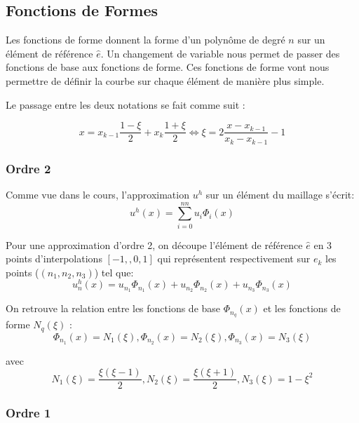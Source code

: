 \documentclass[a4paper,10pt]{report} %
\begin{document}
\subsection{Fonctions de Formes}

Les fonctions de forme donnent la forme d'un polynôme de degré $n$ sur un élément de référence $\hat{e}$. Un changement de variable nous permet de passer des fonctions de base aux fonctions de forme. Ces fonctions de forme vont nous permettre de définir la courbe sur chaque élément de manière plus simple.

Le passage entre les deux notations se fait comme suit :

\begin{displaymath}
		x=x_{k-1}\frac{1-\xi}{2}+x_{k}\frac{1+\xi}{2} \Leftrightarrow \xi=2\frac{x-x_{k-1}}{x_{k}-x_{k-1}}-1
\end{displaymath}

\subsubsection{Ordre 2}

Comme vue dans le cours, l'approximation $u^{h}$ sur un élément du maillage s'écrit:
\begin{displaymath}
u^{h}(x)=\sum_{i=0}^{nn}u_{i}\Phi_{i}(x)\end{displaymath}

Pour une approximation d'ordre 2, on découpe l'élément de référence $\hat{e}$ en 3 points d'interpolations $[-1,,0,1]$ qui représentent respectivement sur $e_{k}$ les points ($(n_{1},n_{2},n_{3})$) tel que:
\begin{displaymath}
u^{h}_n(x)=u_{n_{1}}\Phi_{n_{1}}(x)+u_{n_{2}}\Phi_{n_{2}}(x)+u_{n_{3}}\Phi_{n_{3}}(x)\end{displaymath}

On retrouve la relation entre les fonctions de base  $\Phi_{n_{q}}(x)$ et les fonctions de forme $N_{q}(\xi)$ :
\begin{displaymath}
\Phi_{n_{1}}(x)=N_{1}(\xi), \Phi_{n_{2}}(x)=N_{2}(\xi), \Phi_{n_{3}}(x)=N_{3}(\xi)\end{displaymath}

avec 
\begin{displaymath}
N_{1}(\xi)=\frac{\xi(\xi-1)}{2},  N_{2}(\xi)=\frac{\xi(\xi+1)}{2},  N_{3}(\xi)=1-\xi^{2}\end{displaymath}

\subsubsection{Ordre 1}
\end{document}
